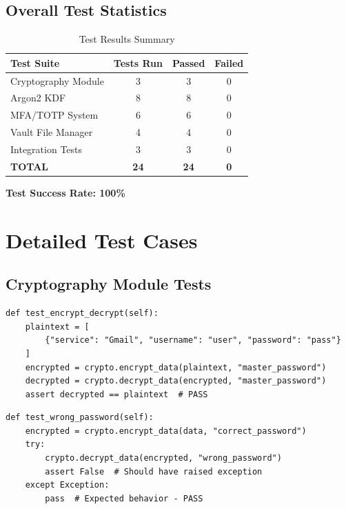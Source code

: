 \documentclass[12pt,a4paper]{report}
\begin{document}
\subsection{Overall Test Statistics}

\begin{table}[H]
\centering
\begin{tabular}{|l|c|c|c|}
\hline
\textbf{Test Suite} & \textbf{Tests Run} & \textbf{Passed} & \textbf{Failed} \\
\hline
Cryptography Module & 3 & 3 & 0 \\
Argon2 KDF & 8 & 8 & 0 \\
MFA/TOTP System & 6 & 6 & 0 \\
Vault File Manager & 4 & 4 & 0 \\
Integration Tests & 3 & 3 & 0 \\
\hline
\textbf{TOTAL} & \textbf{24} & \textbf{24} & \textbf{0} \\
\hline
\end{tabular}
\caption{Test Results Summary}
\end{table}

\textbf{Test Success Rate: 100\%}

\section{Detailed Test Cases}

\subsection{Cryptography Module Tests}

\begin{lstlisting}[caption=Test Case: Encrypt/Decrypt Cycle]
def test_encrypt_decrypt(self):
    plaintext = [
        {"service": "Gmail", "username": "user", "password": "pass"}
    ]
    encrypted = crypto.encrypt_data(plaintext, "master_password")
    decrypted = crypto.decrypt_data(encrypted, "master_password")
    assert decrypted == plaintext  # PASS
\end{lstlisting}

\begin{lstlisting}[caption=Test Case: Wrong Password Rejection]
def test_wrong_password(self):
    encrypted = crypto.encrypt_data(data, "correct_password")
    try:
        crypto.decrypt_data(encrypted, "wrong_password")
        assert False  # Should have raised exception
    except Exception:
        pass  # Expected behavior - PASS
\end{lstlisting}
\end{document}
